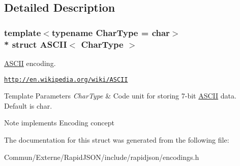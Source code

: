 \subsection{Detailed Description}
\subsubsection*{template$<$typename Char\+Type = char$>$\\*
struct A\+S\+C\+I\+I$<$ Char\+Type $>$}

\hyperlink{struct_a_s_c_i_i}{A\+S\+C\+II} encoding. 

\href{http://en.wikipedia.org/wiki/ASCII}{\tt http\+://en.\+wikipedia.\+org/wiki/\+A\+S\+C\+II} 
\begin{DoxyTemplParams}{Template Parameters}
{\em Char\+Type} & Code unit for storing 7-\/bit \hyperlink{struct_a_s_c_i_i}{A\+S\+C\+II} data. Default is char. \\
\hline
\end{DoxyTemplParams}
\begin{DoxyNote}{Note}
implements Encoding concept 
\end{DoxyNote}


The documentation for this struct was generated from the following file\+:\begin{DoxyCompactItemize}
\item 
Commun/\+Externe/\+Rapid\+J\+S\+O\+N/include/rapidjson/encodings.\+h\end{DoxyCompactItemize}
